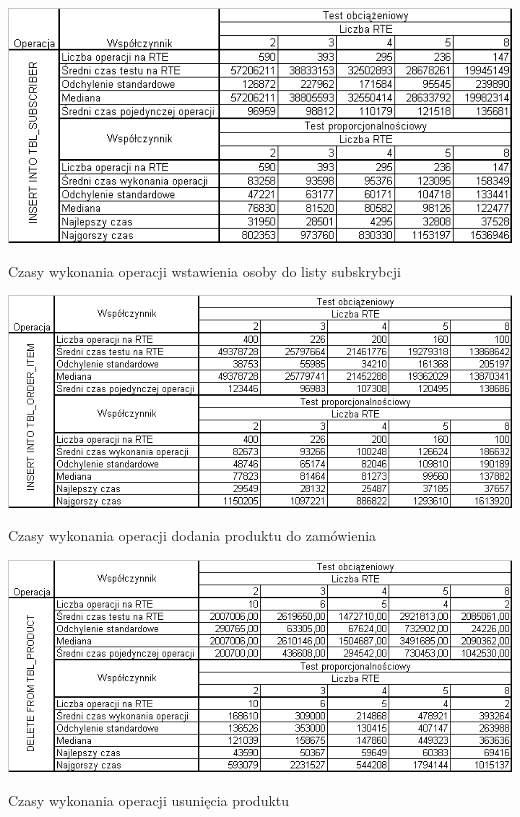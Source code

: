 \begin{table}[h]
\begin{center}
\includegraphics[width=0.9\linewidth]{figures/time_tab02.png}
\end{center}
\caption{Czasy wykonania operacji wstawienia osoby do listy subskrybcji}\label{tab:time_tab02}
\end{table}

\begin{table}[h]
\begin{center}
\includegraphics[width=0.9\linewidth]{figures/time_tab03.png}
\end{center}
\caption{Czasy wykonania operacji dodania produktu do zamówienia}\label{tab:time_tab03}
\end{table}

\begin{table}[h]
\begin{center}
\includegraphics[width=0.9\linewidth]{figures/time_tab04.png}
\end{center}
\caption{Czasy wykonania operacji usunięcia produktu}\label{tab:time_tab04}
\end{table}

